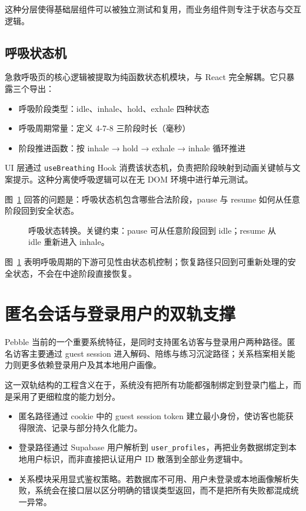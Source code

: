 这种分层使得基础层组件可以被独立测试和复用，而业务组件则专注于状态与交互逻辑。

\subsection{呼吸状态机}

急救呼吸页的核心逻辑被提取为纯函数状态机模块，与 React 完全解耦。它只暴露三个导出：

\begin{itemize}
  \item 呼吸阶段类型：idle、inhale、hold、exhale 四种状态
  \item 呼吸周期常量：定义 4-7-8 三阶段时长（毫秒）
  \item 阶段推进函数：按 inhale → hold → exhale → inhale 循环推进
\end{itemize}

UI 层通过 \texttt{useBreathing} Hook 消费该状态机，负责把阶段映射到动画关键帧与文案提示。这种分离使呼吸逻辑可以在无 DOM 环境中进行单元测试。

图~\ref{fig:pebble-breathing-state} 回答的问题是：呼吸状态机包含哪些合法阶段，pause 与 resume 如何从任意阶段回到安全状态。

\begin{figure}[H]
  \centering
  
  \caption{呼吸状态转换。关键约束：pause 可从任意阶段回到 idle；resume 从 idle 重新进入 inhale。}
  \label{fig:pebble-breathing-state}
\end{figure}

图~\ref{fig:pebble-breathing-state} 表明呼吸周期的下游可见性由状态机控制；恢复路径只回到可重新处理的安全状态，不会在中途阶段直接恢复。

\section{匿名会话与登录用户的双轨支撑}

Pebble 当前的一个重要系统特征，是同时支持匿名访客与登录用户两种路径。匿名访客主要通过 guest session 进入解码、陪练与练习沉淀路径；关系档案相关能力则更多依赖登录用户及其本地用户画像。

这一双轨结构的工程含义在于，系统没有把所有功能都强制绑定到登录门槛上，而是采用了更细粒度的能力划分。

\begin{itemize}
  \item 匿名路径通过 cookie 中的 guest session token 建立最小身份，使访客也能获得限流、记录与部分持久化能力。
  \item 登录路径通过 Supabase 用户解析到 \texttt{user\_profiles}，再把业务数据绑定到本地用户标识，而非直接把认证用户 ID 散落到全部业务逻辑中。
  \item 关系模块采用显式鉴权策略。若数据库不可用、用户未登录或本地画像解析失败，系统会在接口层以区分明确的错误类型返回，而不是把所有失败都混成统一异常。
\end{itemize}

